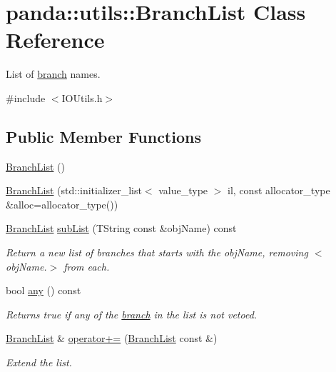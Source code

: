 \hypertarget{classpanda_1_1utils_1_1BranchList}{
\section{panda::utils::BranchList Class Reference}
\label{classpanda_1_1utils_1_1BranchList}
}


List of \hyperlink{namespacepanda_1_1branch}{branch} names.  


{\ttfamily \#include $<$IOUtils.h$>$}\subsection*{Public Member Functions}
\begin{DoxyCompactItemize}
\item 
\hyperlink{classpanda_1_1utils_1_1BranchList_a3902851c681dcd533d78c62c85d8e1eb}{BranchList} ()
\item 
\hyperlink{classpanda_1_1utils_1_1BranchList_a0dfdfc0bac1a7e53dbcaccca50ed6027}{BranchList} (std::initializer\_\-list$<$ value\_\-type $>$ il, const allocator\_\-type \&alloc=allocator\_\-type())
\item 
\hyperlink{classpanda_1_1utils_1_1BranchList}{BranchList} \hyperlink{classpanda_1_1utils_1_1BranchList_a215520401f32786d157a68ee92d90372}{subList} (TString const \&objName) const 
\begin{DoxyCompactList}\small\item\em Return a new list of branches that starts with the objName, removing $<$objName.$>$ from each. \item\end{DoxyCompactList}\item 
bool \hyperlink{classpanda_1_1utils_1_1BranchList_aead8646065a2422c246b8d04f66dd00d}{any} () const 
\begin{DoxyCompactList}\small\item\em Returns true if any of the \hyperlink{namespacepanda_1_1branch}{branch} in the list is not vetoed. \item\end{DoxyCompactList}\item 
\hyperlink{classpanda_1_1utils_1_1BranchList}{BranchList} \& \hyperlink{classpanda_1_1utils_1_1BranchList_a4cb8f7877ab1f20bd4f7714e840b5a1e}{operator+=} (\hyperlink{classpanda_1_1utils_1_1BranchList}{BranchList} const \&)
\begin{DoxyCompactList}\small\item\em Extend the list. \item\end{DoxyCompactList}\end{DoxyCompactItemize}


